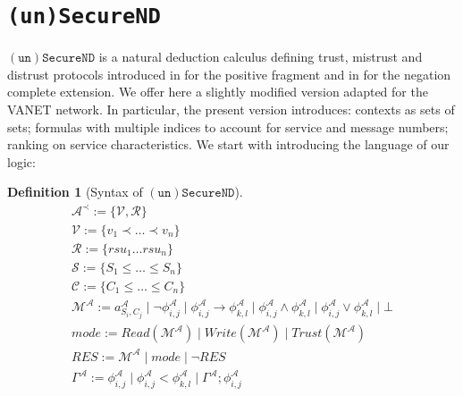 \documentclass[compsoc, conference, letterpaper, 10pt, times]{IEEEtran}
\newtheorem{definition}{Definition}
\begin{document}
\section{\texttt{(un)SecureND}}\label{sec:logic}

$\mathtt{(un)SecureND}$ is a natural deduction calculus defining trust, mistrust and distrust protocols introduced in \cite{primiero_secureND} for the positive fragment  and in \cite{DBLP:conf/ifiptm/Primiero16} for the negation complete extension. We offer here a slightly modified version adapted for the VANET network. In particular, the present version introduces: contexts as sets of sets; formulas with multiple indices to account for service and message numbers; ranking on service characteristics. We start with introducing the language of our logic:

\begin{definition}[Syntax of $\mathtt{(un)SecureND}$]\label{def:syntax} %
	\begin{displaymath}
	\begin{array}{l}
	\mathcal{A}^{\prec}:= \{\mathcal{V, R}\}\\
	\mathcal{V}:= \{v_{1}\prec \ldots \prec v_{n}\}\\
	\mathcal{R}:= \{rsu_{1}\ldots rsu_{n}\}\\
	\mathcal{S}:= \{S_{1}\leq \dots \leq S_{n}\}\\  %
	\mathcal{C}:= \{C_{1}\leq \dots \leq C_{n}\}\\  %
	\mathcal{M^{\mathcal{A}}}:= a^{\mathcal{A}}_{S_{i},C_{j}}\mid \neg \phi^{\mathcal{A}}_{i,j}\mid \phi^{\mathcal{A}}_{i,j}\rightarrow \phi^{\mathcal{A}}_{k,l}\mid \phi^{\mathcal{A}}_{i,j}\wedge \phi^{\mathcal{A}}_{k,l}\mid \phi^{\mathcal{A}}_{i,j}\vee \phi^{\mathcal{A}}_{k,l} \mid \bot\\
	mode:= Read(\mathcal{M}^{\mathcal{A}})\mid Write(\mathcal{M}^{\mathcal{A}})\mid Trust(\mathcal{M}^{\mathcal{A}})\\
	RES:= \mathcal{M}^{\mathcal{A}}\mid mode\mid \neg RES\\
	\Gamma^{\mathcal{A}}:= 
	\phi^{\mathcal{A}}_{i,j} \mid \phi^{\mathcal{A}}_{i,j} < \phi^{\mathcal{A}}_{k,l} \mid \Gamma^{\mathcal{A}}; \phi^{\mathcal{A}}_{i,j}
	
	\end{array}
	\end{displaymath}
\end{definition}
%
\end{document}
